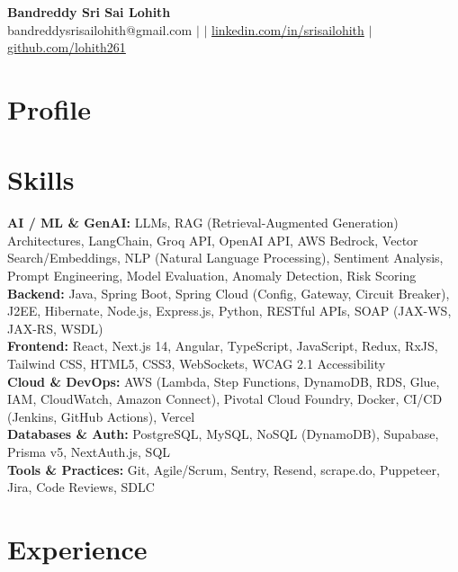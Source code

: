 \documentclass[10pt,letterpaper]{article}
\newcommand{\skillrow}[2]{\textbf{#1:} #2 \\[1pt]}
\begin{document}
\begin{center}
  {\Huge\bfseries Bandreddy Sri Sai Lohith}\\[3pt]
  \small bandreddysrisailohith@gmail.com $\vert$ $\vert$\; \href{https://linkedin.com/in/srisailohith}{linkedin.com/in/srisailohith} $\vert$\; \href{https://github.com/lohith261}{github.com/lohith261}
\end{center}

\section{Profile}


\section{Skills}

\skillrow{AI / ML \& GenAI}{LLMs, RAG (Retrieval-Augmented Generation) Architectures, LangChain, Groq API, OpenAI API, AWS Bedrock, Vector Search/Embeddings, NLP (Natural Language Processing), Sentiment Analysis, Prompt Engineering, Model Evaluation, Anomaly Detection, Risk Scoring}
\skillrow{Backend}{Java, Spring Boot, Spring Cloud (Config, Gateway, Circuit Breaker), J2EE, Hibernate, Node.js, Express.js, Python, RESTful APIs, SOAP (JAX-WS, JAX-RS, WSDL)}
\skillrow{Frontend}{React, Next.js 14, Angular, TypeScript, JavaScript, Redux, RxJS, Tailwind CSS, HTML5, CSS3, WebSockets, WCAG 2.1 Accessibility}
\skillrow{Cloud \& DevOps}{AWS (Lambda, Step Functions, DynamoDB, RDS, Glue, IAM, CloudWatch, Amazon Connect), Pivotal Cloud Foundry, Docker, CI/CD (Jenkins, GitHub Actions), Vercel}
\skillrow{Databases \& Auth}{PostgreSQL, MySQL, NoSQL (DynamoDB), Supabase, Prisma v5, NextAuth.js, SQL}
\skillrow{Tools \& Practices}{Git, Agile/Scrum, Sentry, Resend, scrape.do, Puppeteer, Jira, Code Reviews, SDLC}

\section{Experience}
\end{document}
